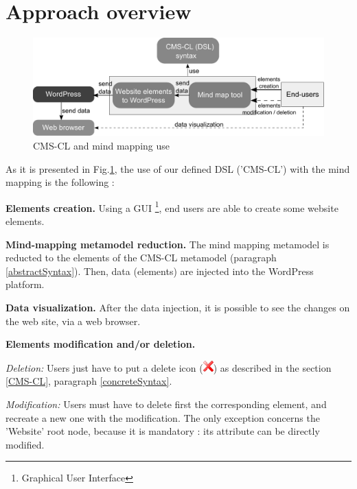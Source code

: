\section{Approach overview} \label{approachOverview}

	\begin{figure}[!h]
		\centering
		\includegraphics[width=\textwidth]{../resources/pdf/endUsersSimplifiedPresentation.pdf}
		\caption{CMS-CL and mind mapping use}
		\label{CMS-CLMindMappingUse}
	\end{figure}

	As it is presented in Fig.\ref{CMS-CLMindMappingUse}, the use of our defined DSL 	('CMS-CL') with the mind mapping is the following :	
	
	\vspace{0.15em}
	\noindent\textbf{Elements creation.} Using a GUI \footnote{Graphical User Interface}, end users are able to create some website elements.	
	
	\vspace{0.15em}
	\noindent\textbf{Mind-mapping metamodel reduction.} The mind mapping metamodel is reducted to the elements of the CMS-CL metamodel (paragraph \ref{abstractSyntax}). Then, data (elements) are injected into the WordPress platform.	
	
	\vspace{0.15em}
	\noindent\textbf{Data visualization.} After the data injection, it is possible to see the changes on the web site, via a web browser.	
	
	\vspace{0.15em}
	\noindent\textbf{Elements modification and/or deletion.}
	
	\vspace{0.15em}
	\noindent\textit{Deletion:} Users just have to put a delete icon
	(\includegraphics[scale=0.50]{../resources/png/delete.png}) as described in the section \ref{CMS-CL}, paragraph \ref{concreteSyntax}.
	
	\vspace{0.15em}
	\noindent\textit{Modification:} Users must have to delete first the corresponding element, and recreate a new one with the 					modification. The only exception concerns the 'Website' root node, because it is mandatory : its attribute can be directly modified.